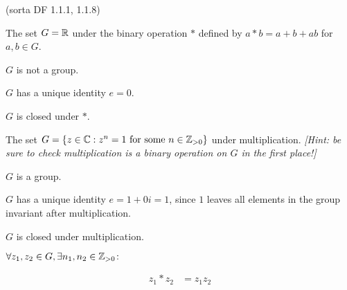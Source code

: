 \begin{problem}{\textsf{(sorta DF 1.1.1, 1.1.8)}}
\begin{enumalph}
\begin{Answer}
\begin{enumalph}
      \end{enumalph}
    \end{Answer}
    \item The set $G=\mathbb{R}$ under the binary operation $*$ defined by $a*b=a+b+ab$ for 
    $a,b\in G$.
    \begin{Answer}
      $G$ is not a group.
      \begin{enumalph}
        \item $G$ has a unique identity $e = 0$.
        \item $G$ is closed under $*$.
        \item {}
      \end{enumalph}
    \end{Answer}
    \newpage
    \item The set $G=\{z \in \mathbb{C}:z^n=1\text{ for some $n \in \mathbb{Z}_{>0}$}\}$ under 
    multiplication.  \emph{[Hint: be sure to check multiplication is a binary operation
    on $G$ in the first place!]}
    \begin{Answer}
      $G$ is a group.
      \begin{enumalph}
        \item $G$ has a unique identity $e = 1 + 0i = 1$, 
        since $1$ leaves all elements in the group invariant after multiplication.
        \item $G$ is closed under multiplication.
        
        \noindent
        $\forall z_{1}, z_{2} \in G, \exists n_{1}, n_{2} \in \mathbb{Z}_{>0} \colon$
        
        \begin{align*}
          z_{1}*z_{2} &= z_{1}z_{2}\\
        \end{align*}


\end{enumalph}
\end{Answer}
\end{enumalph}
\end{problem}
